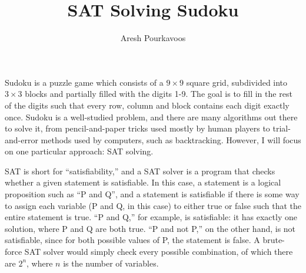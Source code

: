 \documentclass{article}
\begin{document}
\title{SAT Solving Sudoku}
\author{Aresh Pourkavoos}
\maketitle

Sudoku is a puzzle game which consists of a $9 \times 9$ square grid,
subdivided into $3 \times 3$ blocks
and partially filled with the digits 1-9.
The goal is to fill in the rest of the digits such that
every row, column and block contains each digit exactly once.
Sudoku is a well-studied problem,
and there are many algorithms out there to solve it,
from pencil-and-paper tricks used mostly by human players
to trial-and-error methods used by computers, such as backtracking.
However, I will focus on one particular approach: SAT solving.

SAT is short for ``satisfiability,''
and a SAT solver is a program that checks
whether a given statement is satisfiable.
In this case, a statement is a logical proposition
such as ``P and Q'',
and a statement is satisfiable
if there is some way to assign each variable
(P and Q, in this case) to either true or false
such that the entire statement is true.
``P and Q,'' for example, is satisfiable:
it has exactly one solution, where P and Q are both true.
``P and not P,'' on the other hand, is not satisfiable,
since for both possible values of P, the statement is false.
A brute-force SAT solver would simply check every possible combination,
of which there are $2^n$, where $n$ is the number of variables.
\end{document}
